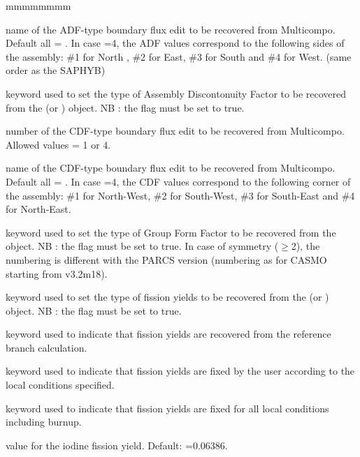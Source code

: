 \begin{ListeDeDescription}{mmmmmmmm}
\item[\dusa{hadf}] name of the ADF-type boundary flux edit to be recovered from Multicompo. Default all  = . In case =4, the ADF values correspond to the following sides of the assembly: \#1 for North , \#2 for East, \#3 for South  and \#4 for West. (same order as the SAPHYB)

\item[\moc{CDF}] keyword used to set the type of Assembly Discontonuity Factor to be recovered from the  (or )   object. NB : the  flag must be set to true. 

\item[\dusa{ncdf}] number of the CDF-type boundary flux edit to be recovered from Multicompo. Allowed values  = 1 or 4.

\item[\dusa{hcdf}] name of the CDF-type boundary flux edit to be recovered from Multicompo. Default all  = . In case =4, the CDF values correspond to the following corner of the assembly: \#1 for North-West, \#2 for South-West, \#3 for South-East and \#4 for North-East.

\item[\moc{GFF}] keyword used to set the type of Group Form Factor to be recovered from the   object. NB : the  flag must be set to true. In case of symmetry ($\ge$2), the numbering is different with the PARCS version (numbering as for CASMO starting from v3.2m18). 

\item[\moc{YLD}] keyword used to set the type of fission yields to be recovered from the  (or )   object. NB : the  flag must be set to true.

\item[\moc{REF}] keyword used to indicate that fission yields are recovered from the reference branch calculation. 

\item[\moc{MAN}] keyword used to indicate that fission yields are fixed by the user according to the local conditions specified.

\item[\moc{FIX}] keyword used to indicate that fission yields are fixed for all local conditions including burnup.

\item[\dusa{yldi}] value for the iodine fission yield. Default: =0.06386.


\end{ListeDeDescription}
